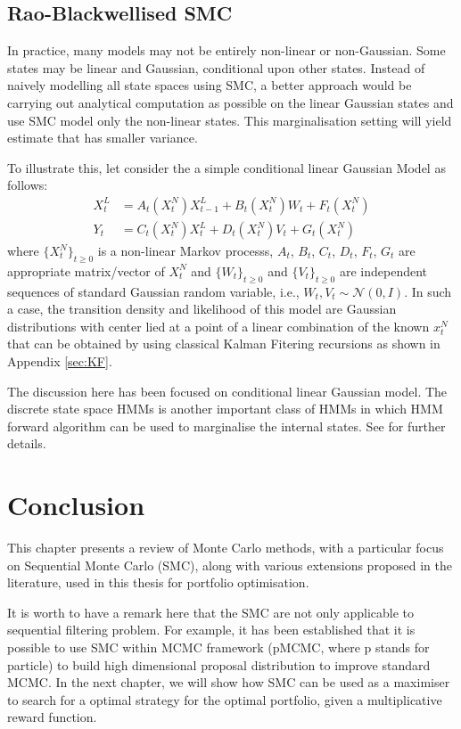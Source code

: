 \subsection{Rao-Blackwellised SMC}
\label{sec:msmc}
In practice, many models may not be entirely non-linear or non-Gaussian. Some states may be linear and Gaussian, conditional upon other states. Instead of naively modelling all state spaces using SMC, a better approach would be carrying out analytical computation as possible on the linear Gaussian states and use SMC model only the non-linear states. This marginalisation setting will yield estimate that has smaller variance.

To illustrate this, let consider the a simple conditional linear Gaussian Model as follows:
\begin{align}
  X^L_t &= A_t(X^N_t)X^L_{t-1} + B_t(X^N_t)W_t + F_t(X^N_t) \\
  Y_t &= C_t(X^N_t)X^L_t + D_t(X^N_t)V_t + G_t(X^N_t)
\end{align}
where $\{X^N_t\}_{t \geq 0}$ is a non-linear Markov processs, $A_t$, $B_t$, $C_t$, $D_t$, $F_t$, $G_t$ are appropriate matrix/vector of $X^N_t$ and  $\{W_t\}_{t \geq 0}$ and  $\{V_t\}_{t \geq 0}$ are independent sequences of standard Gaussian random variable, i.e., $W_t, V_t \sim \mathcal{N}(0,I)$. In such a case, the transition density and likelihood of this model are Gaussian distributions with center lied at a point of a linear combination of the known $x^N_t$ that can be obtained by using classical Kalman Fitering recursions as shown in Appendix \ref{sec:KF}.


The discussion here has been focused on conditional linear Gaussian model. The discrete state space HMMs is another important class of HMMs in which HMM forward algorithm \cite{LRR89} can be used to marginalise the internal states. See \cite{CO05} for further details.


\section{Conclusion}
This chapter presents a review of Monte Carlo methods, with a particular focus on Sequential Monte Carlo (SMC), along with various extensions proposed in the literature, used in this thesis for portfolio optimisation.

It is worth to have a remark here that the SMC are not only applicable to sequential filtering problem. For example, it has been established that it is possible to use SMC within MCMC framework (pMCMC, where p stands for particle) \cite{CA10} to build high dimensional proposal distribution to improve standard MCMC. In the next chapter, we will show how SMC can be used as a maximiser to search for a optimal strategy for the optimal portfolio, given a multiplicative reward function.



